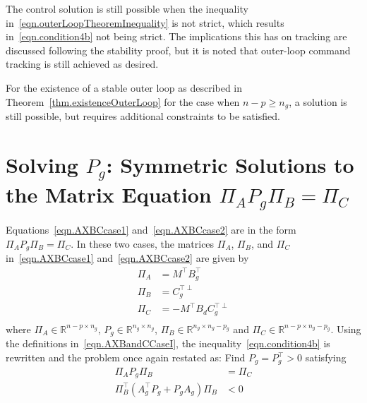 \documentclass[journal]{IEEEtran}
\theoremstyle{innercustomthm}
\begin{document}
  \begin{rem-dan}
    The control solution is still possible when the inequality in\ \eqref{eqn.outerLoopTheoremInequality} is not strict, which results in\ \eqref{eqn.condition4b} not being strict.
    The implications this has on tracking are discussed following the stability proof, but it is noted that outer-loop command tracking is still achieved as desired.
  \end{rem-dan}

  \begin{rem-dan}
    For the existence of a stable outer loop as described in Theorem~\ref{thm.existenceOuterLoop} for the case when $n-p\geq n_{g}$, a solution is still possible, but requires additional constraints to be satisfied.
  \end{rem-dan}

  \section{Solving \texorpdfstring{$P_{g}$}{Pg}: Symmetric Solutions to the Matrix Equation \texorpdfstring{$\Pi_{A}P_{g}\Pi_{B}=\Pi_{C}$}{piAPgpiB=piC}}

  Equations\ \eqref{eqn.AXBCcase1} and\ \eqref{eqn.AXBCcase2} are in the form $\Pi_{A}P_{g}\Pi_{B}=\Pi_{C}$.
  In these two cases, the matrices $\Pi_{A}$, $\Pi_{B}$, and $\Pi_{C}$ in\ \eqref{eqn.AXBCcase1} and\ \eqref{eqn.AXBCcase2} are given by
  \begin{equation}
    \label{eqn.AXBandCCaseI}
    \begin{split}
      \Pi_{A} &= M^{\top}B_{g}^{\top} \\
      \Pi_{B} &= C_{g}^{\top\perp} \\
      \Pi_{C} &= -M^{\top}B_{d}C_{g}^{\top\perp} \\
    \end{split}
  \end{equation}
  where $\Pi_{A}\in\mathbb{R}^{n-p\times n_{g}}$, $P_{g}\in\mathbb{R}^{n_{g}\times n_{g}}$, $\Pi_{B}\in\mathbb{R}^{n_{g}\times n_{g}-p_{g}}$ and $\Pi_{C}\in\mathbb{R}^{n-p\times n_{g}-p_{g}}$.
  Using the definitions in\ \eqref{eqn.AXBandCCaseI}, the inequality\ \eqref{eqn.condition4b} is rewritten and the problem once again restated as: Find $P_{g}=P_{g}^{\top}>0$ satisfying
  \begin{align}
    \label{eqn.PiAPgPiBPiC}
    \Pi_{A}P_{g}\Pi_{B} &= \Pi_{C} \\
    \label{eqn.condition4bCaseI}
    \Pi_{B}^{\top} (A_{g}^{\top}P_{g} + P_{g}A_{g}) \Pi_{B} &< 0
  \end{align}
\end{document}
